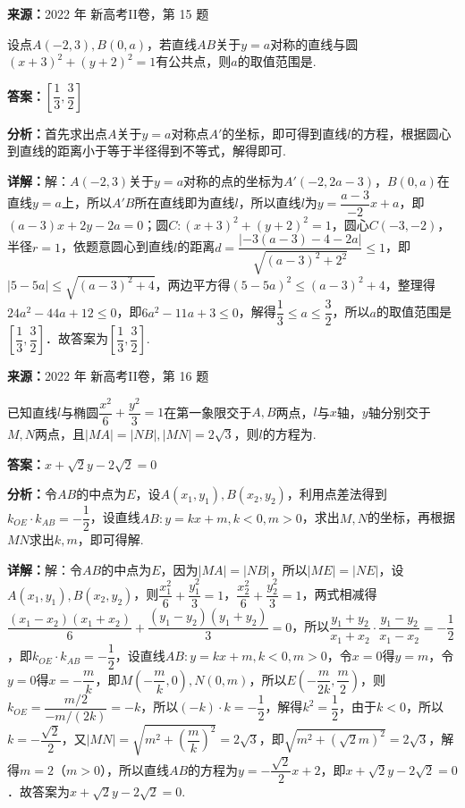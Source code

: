 \begin{question}[points=5]
\textbf{来源：}2022 年 新高考II卷，第 15 题\par
设点$A(-2,3),B(0,a)$，若直线$AB$关于$y=a$对称的直线与圆$(x+3)^2+(y+2)^2=1$有公共点，则$a$的取值范围是.
\begin{solution}
\textbf{答案：}$\left[\dfrac{1}{3},\dfrac{3}{2}\right]$

\textbf{分析：}首先求出点$A$关于$y=a$对称点$A'$的坐标，即可得到直线$l$的方程，根据圆心到直线的距离小于等于半径得到不等式，解得即可.

\textbf{详解：}解：$A(-2,3)$关于$y=a$对称的点的坐标为$A'(-2,2a-3)$，$B(0,a)$在直线$y=a$上，所以$A'B$所在直线即为直线$l$，所以直线$l$为$y=\dfrac{a-3}{-2}x+a$，即$(a-3)x+2y-2a=0$；圆$C:(x+3)^2+(y+2)^2=1$，圆心$C(-3,-2)$，半径$r=1$，依题意圆心到直线$l$的距离$d=\dfrac{|-3(a-3)-4-2a|}{\sqrt{(a-3)^2+2^2}}\leq 1$，即$|5-5a|\leq\sqrt{(a-3)^2+4}$，两边平方得$(5-5a)^2\leq (a-3)^2+4$，整理得$24a^2-44a+12\leq 0$，即$6a^2-11a+3\leq 0$，解得$\dfrac{1}{3}\leq a\leq \dfrac{3}{2}$，所以$a$的取值范围是$\left[\dfrac{1}{3},\dfrac{3}{2}\right]$．故答案为$\left[\dfrac{1}{3},\dfrac{3}{2}\right]$.
\end{solution}
\end{question}

\begin{question}[points=5]
\textbf{来源：}2022 年 新高考II卷，第 16 题\par
已知直线$l$与椭圆$\dfrac{x^2}{6}+\dfrac{y^2}{3}=1$在第一象限交于$A,B$两点，$l$与$x$轴，$y$轴分别交于$M,N$两点，且$|MA|=|NB|,|MN|=2\sqrt{3}$，则$l$的方程为.
\fillin[{$x+\sqrt{2}y-2\sqrt{2}=0$}]
\begin{solution}
\textbf{答案：}$x+\sqrt{2}y-2\sqrt{2}=0$

\textbf{分析：}令$AB$的中点为$E$，设$A(x_1,y_1),B(x_2,y_2)$，利用点差法得到$k_{OE}\cdot k_{AB}=-\dfrac{1}{2}$，设直线$AB:y=kx+m,k<0,m>0$，求出$M,N$的坐标，再根据$MN$求出$k,m$，即可得解.

\textbf{详解：}解：令$AB$的中点为$E$，因为$|MA|=|NB|$，所以$|ME|=|NE|$，设$A(x_1,y_1),B(x_2,y_2)$，则$\dfrac{x_1^2}{6}+\dfrac{y_1^2}{3}=1$，$\dfrac{x_2^2}{6}+\dfrac{y_2^2}{3}=1$，两式相减得$\dfrac{(x_1-x_2)(x_1+x_2)}{6}+\dfrac{(y_1-y_2)(y_1+y_2)}{3}=0$，所以$\dfrac{y_1+y_2}{x_1+x_2}\cdot\dfrac{y_1-y_2}{x_1-x_2}=-\dfrac{1}{2}$，即$k_{OE}\cdot k_{AB}=-\dfrac{1}{2}$，设直线$AB:y=kx+m,k<0,m>0$，令$x=0$得$y=m$，令$y=0$得$x=-\dfrac{m}{k}$，即$M\left(-\dfrac{m}{k},0\right),N(0,m)$，所以$E\left(-\dfrac{m}{2k},\dfrac{m}{2}\right)$，则$k_{OE}=\dfrac{m/2}{-m/(2k)}=-k$，所以$(-k)\cdot k=-\dfrac{1}{2}$，解得$k^2=\dfrac{1}{2}$，由于$k<0$，所以$k=-\dfrac{\sqrt{2}}{2}$，又$|MN|=\sqrt{m^2+\left(\dfrac{m}{k}\right)^2}=2\sqrt{3}$，即$\sqrt{m^2+(\sqrt{2}m)^2}=2\sqrt{3}$，解得$m=2$（$m>0$），所以直线$AB$的方程为$y=-\dfrac{\sqrt{2}}{2}x+2$，即$x+\sqrt{2}y-2\sqrt{2}=0$．故答案为$x+\sqrt{2}y-2\sqrt{2}=0$.
\end{solution}
\end{question}

